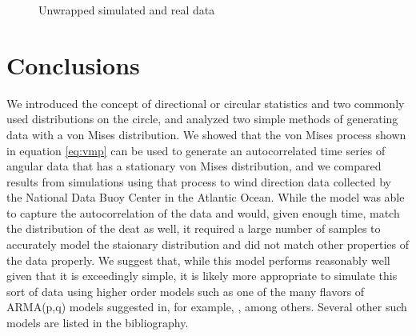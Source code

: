 \documentclass[12pt]{article}
\numberwithin{equation}{section}
\numberwithin{figure}{section}
\begin{document}
\begin{figure}[h]
\centering
{}
\caption{Unwrapped simulated and real data}\label{fig:unwrap}
\end{figure}

\section{Conclusions}

We introduced the concept of directional or circular statistics and two commonly used distributions on the circle, and analyzed two simple methods of generating data with a von Mises distribution. We showed that the von Mises process shown in equation \ref{eq:vmp} can be used to generate an autocorrelated time series of angular data that has a stationary von Mises distribution, and we compared results from simulations using that process to wind direction data collected by the National Data Buoy Center in the Atlantic Ocean. While the model was able to capture the autocorrelation of the data and would, given enough time, match the distribution of the deat as well, it required a large number of samples to accurately model the staionary distribution and did not match other properties of the data properly. We suggest that, while this model performs reasonably well given that it is exceedingly simple, it is likely more appropriate to simulate this sort of data using higher order models such as one of the many flavors of ARMA(p,q) models suggested in, for example, \cite{Harvey}, among others. Several other such models are listed in the bibliography. 
\end{document}
